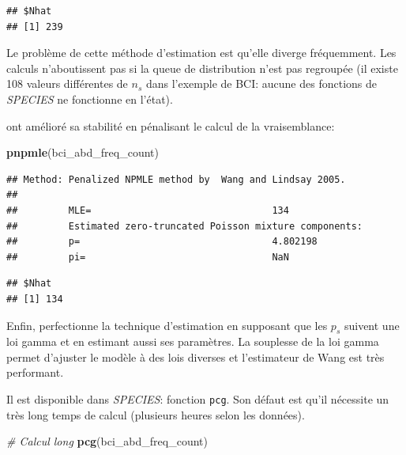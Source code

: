 \documentclass[
  11pt,
  american,
  a4paper,
  extrafontsizes,onecolumn,openright
  ]{memoir}
\newenvironment{Shaded}{\begin{snugshade}}{\end{snugshade}}
\newcommand{\CommentTok}[1]{\textcolor[rgb]{0.56,0.35,0.01}{\textit{#1}}}
\newcommand{\FunctionTok}[1]{\textcolor[rgb]{0.13,0.29,0.53}{\textbf{#1}}}
\newcommand{\NormalTok}[1]{#1}
\newlength{\rf}
\begin{document}
\begin{verbatim}
## $Nhat
## [1] 239
\end{verbatim}

\normalsize

Le problème de cette méthode d'estimation est qu'elle diverge fréquemment.
Les calculs n'aboutissent pas si la queue de distribution n'est pas regroupée (il existe 108 valeurs différentes de \(n_s\) dans l'exemple de BCI: aucune des fonctions de \emph{SPECIES} ne fonctionne en l'état).

\textcite{Wang2005} ont amélioré sa stabilité en pénalisant le calcul de la vraisemblance:

\scriptsize

\begin{Shaded}
\begin{Highlighting}[]
\FunctionTok{pnpmle}\NormalTok{(bci\_abd\_freq\_count)}
\end{Highlighting}
\end{Shaded}

\begin{verbatim}
## Method: Penalized NPMLE method by  Wang and Lindsay 2005. 
## 
##         MLE=                                134 
##         Estimated zero-truncated Poisson mixture components:       
##         p=                                  4.802198 
##         pi=                                 NaN
\end{verbatim}

\begin{verbatim}
## $Nhat
## [1] 134
\end{verbatim}

\normalsize

Enfin, \textcite{Wang2010} perfectionne la technique d'estimation en supposant que les \(p_s\) suivent une loi gamma et en estimant aussi ses paramètres.
La souplesse de la loi gamma permet d'ajuster le modèle à des lois diverses et l'estimateur de Wang est très performant.

Il est disponible dans \emph{SPECIES}: fonction \texttt{pcg}.
Son défaut est qu'il nécessite un très long temps de calcul (plusieurs heures selon les données).

\scriptsize

\begin{Shaded}
\begin{Highlighting}[]
\CommentTok{\# Calcul long}
\FunctionTok{pcg}\NormalTok{(bci\_abd\_freq\_count)}
\end{Highlighting}
\end{Shaded}
\end{document}

